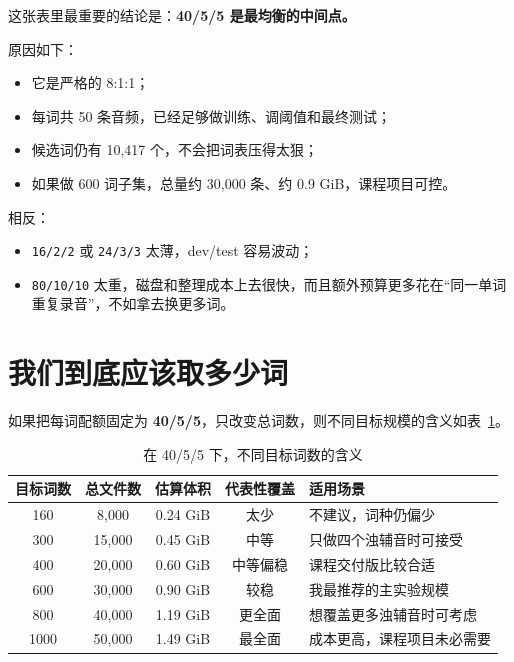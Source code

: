 \documentclass[11pt,a4paper]{ctexart}
\begin{document}
这张表里最重要的结论是：\textbf{40/5/5 是最均衡的中间点。}

原因如下：
\begin{itemize}[nosep]
    \item 它是严格的 8:1:1；
    \item 每词共 50 条音频，已经足够做训练、调阈值和最终测试；
    \item 候选词仍有 10,417 个，不会把词表压得太狠；
    \item 如果做 600 词子集，总量约 30,000 条、约 0.9 GiB，课程项目可控。
\end{itemize}

相反：
\begin{itemize}[nosep]
    \item \texttt{16/2/2} 或 \texttt{24/3/3} 太薄，dev/test 容易波动；
    \item \texttt{80/10/10} 太重，磁盘和整理成本上去很快，而且额外预算更多花在“同一单词重复录音”，不如拿去换更多词。
\end{itemize}

\section{我们到底应该取多少词}

如果把每词配额固定为 \textbf{40/5/5}，只改变总词数，则不同目标规模的含义如表~\ref{tab:target-scales}。

\begin{table}[H]
    \centering
    \caption{在 40/5/5 下，不同目标词数的含义}
    \label{tab:target-scales}
    \begin{tabular}{ccccp{5.0cm}}
        \toprule
        目标词数 & 总文件数 & 估算体积 & 代表性覆盖 & 适用场景 \\
        \midrule
        160 & 8,000 & 0.24 GiB & 太少 & 不建议，词种仍偏少 \\
        300 & 15,000 & 0.45 GiB & 中等 & 只做四个浊辅音时可接受 \\
        400 & 20,000 & 0.60 GiB & 中等偏稳 & 课程交付版比较合适 \\
        600 & 30,000 & 0.90 GiB & 较稳 & 我最推荐的主实验规模 \\
        800 & 40,000 & 1.19 GiB & 更全面 & 想覆盖更多浊辅音时可考虑 \\
        1000 & 50,000 & 1.49 GiB & 最全面 & 成本更高，课程项目未必需要 \\
        \bottomrule
    \end{tabular}
\end{table}
\end{document}
